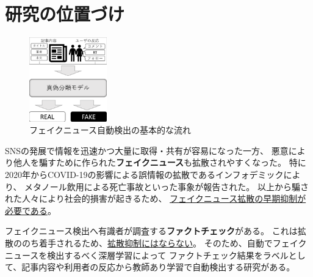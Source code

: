 
\section{研究の位置づけ}


\setlength\intextsep{0pt}
\setlength\textfloatsep{0pt}
\begin{figure}
    \centering
    \includegraphics[width=0.3\textwidth]{figs/base_model.pdf}
    \vspace{-1cm} 
    \caption{フェイクニュース自動検出の基本的な流れ}
    \label{fig:objects}
\end{figure}
SNSの発展で情報を迅速かつ大量に取得・共有が容易になった一方、
悪意により他人を騙すために作られた\textbf{フェイクニュース}も拡散されやすくなった。
特に2020年からCOVID-19の影響による誤情報の拡散であるインフォデミックにより、
メタノール飲用による死亡事故\cite{iraninfo}といった事象が報告された。
以上から騙された人々により社会的損害が起きるため、
\underline{フェイクニュース拡散の早期抑制が必要である}\cite{snsinfo}。

フェイクニュース検出へ有識者が調査する\textbf{ファクトチェック}がある。
これは拡散ののち着手されるため、\underline{拡散抑制にはならない}。
そのため、自動でフェイクニュースを検出するべく深層学習によって
ファクトチェック結果をラベルとして、記事内容や利用者の反応から教師あり学習で自動検出する研究がある\cite{Wang:2018:EEA:3219819.3219903}。

